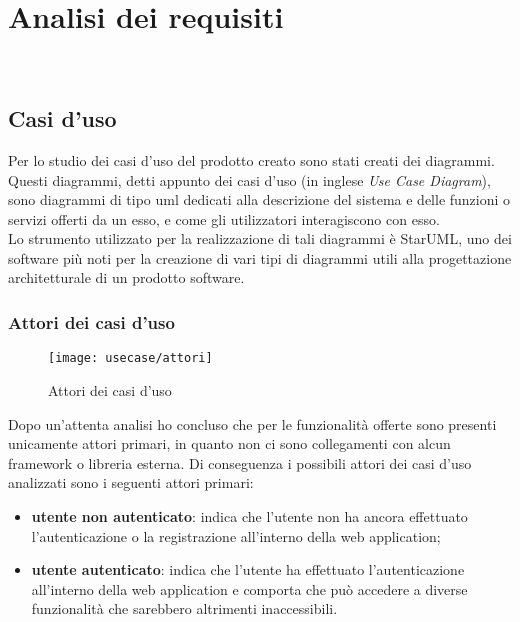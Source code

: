 
\chapter{Analisi dei requisiti}
\label{cap:analisi-requisiti}

\\

\section{Casi d'uso}

Per lo studio dei casi d'uso del prodotto creato sono stati creati dei diagrammi.
Questi diagrammi, detti appunto dei casi d'uso (in inglese \emph{Use Case Diagram}), sono diagrammi di tipo \gls{uml} dedicati alla descrizione del sistema e delle funzioni o servizi offerti da un esso, e come gli utilizzatori interagiscono con esso.\\
Lo strumento utilizzato per la realizzazione di tali diagrammi è StarUML, uno dei software più noti per la creazione di vari tipi di diagrammi utili alla progettazione architetturale di un prodotto software.

\subsection{Attori dei casi d'uso}
\begin{figure}[H] 
	\centering 
	\texttt{[image: usecase/attori]} 
	\caption{Attori dei casi d'uso}
\end{figure}
Dopo un'attenta analisi ho concluso che per le funzionalità offerte sono presenti unicamente attori primari, in quanto non ci sono collegamenti con alcun framework o libreria esterna.
Di conseguenza i possibili attori dei casi d'uso analizzati sono i seguenti attori primari:
\begin{itemize}
	\item \textbf{utente non autenticato}: indica che l'utente non ha ancora effettuato l'autenticazione o la registrazione all'interno della web application;
	\item \textbf{utente autenticato}: indica che l'utente ha effettuato l'autenticazione all'interno della web application e comporta che può accedere a diverse funzionalità che sarebbero altrimenti inaccessibili.
\end{itemize}

